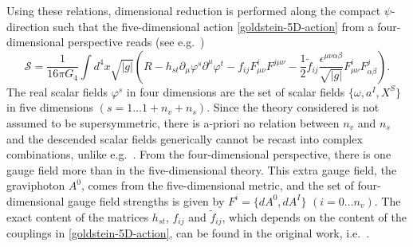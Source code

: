 \documentclass[12pt,twoside]{book}
\begin{document}
Using these relations, dimensional reduction is performed along the compact $\psi$-direction such that the five-dimensional action \eqref{goldstein-5D-action} from a four-dimensional perspective reads (see e.g.\ \cite{Goldstein:2007kx})
\begin{equation}\label{goldstein-4D-action}
\mathcal{S} = \frac{1}{16\pi G_{4}} \int d^{4}x \sqrt{|g|}
\left( R - h_{st}\partial_{\mu}\varphi^{s}\partial^{\mu}\varphi^{t} - f_{ij}F^{i}_{\mu\nu}F^{j\mu\nu}
- \frac{1}{2} \tilde{f}_{ij} \frac{ \epsilon^{\mu\nu\alpha\beta}}{\sqrt{|g|}} F^{i}_{\mu\nu} F^{j}_{\alpha\beta}
\right).
\end{equation}
The real scalar fields $\varphi^{s}$ in four dimensions are the set of scalar fields $\{ \omega,a^{I},X^{S} \}$ in five dimensions $(s = 1 \ldots 1 + n_{v}+n_{s})$. Since the theory considered is not assumed to be supersymmetric, there is a-priori no relation between $n_{v}$ and $n_{s}$ and the descended scalar fields generically cannot be recast into complex combinations, unlike e.g.\  \cite{Cardoso:2007vn}. From the four-dimensional perspective, there is one gauge field more than in the five-dimensional theory. This extra gauge field, the graviphoton $A^{0}$, comes from the five-dimensional metric, and the set of four-dimensional gauge field strengths is given by $F^{i} = \{dA^{0},dA^{I}\}$ $(i = 0 \ldots n_{v})$. The exact content of the matrices $h_{st}$, $f_{ij}$ and $\tilde{f}_{ij}$, which depends on the content of the couplings in \eqref{goldstein-5D-action}, can be found in the original work, i.e.\ \cite{Goldstein:2007kx}.
\end{document}

